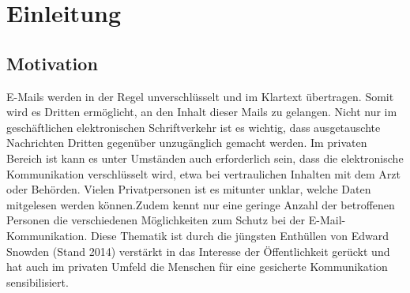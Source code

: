 \documentclass  [paper=a4,
				fontsize=12pt,
				listof=totoc,
				bibliography=totoc
				]{scrreprt}
\begin{document}
	\parindent 0pt %
	
	\pagebreak	%
  \pagestyle{plain}
\begin{small}
  \tableofcontents
	\listoffigures %
	\pagebreak
	\listoftables %
	\pagebreak
	\pagebreak
\end{small}
	\setcounter{page}{1} %
		\pagestyle{fancyplain}
		\fancyhf{}							%
		\renewcommand{\headrulewidth}{0.4pt}
		\footskip =30pt
		\renewcommand{\chaptermark}[1]{\markboth{#1}{}}	%
		\rhead{\nouppercase{\leftmark}}	
		\cfoot{\thepage\ / \pageref{LastPage}}

\chapter{Einleitung}
		\section{Motivation}
		E-Mails werden in der Regel unverschlüsselt und im Klartext übertragen. Somit wird es Dritten ermöglicht, an den Inhalt dieser Mails zu gelangen. Nicht nur im geschäftlichen elektronischen Schriftverkehr ist es wichtig, dass ausgetauschte Nachrichten Dritten gegenüber unzugänglich gemacht werden. Im privaten Bereich ist kann es unter Umständen auch erforderlich sein, dass die elektronische Kommunikation verschlüsselt wird, etwa bei vertraulichen Inhalten mit dem Arzt oder Behörden. Vielen Privatpersonen ist es mitunter unklar, welche Daten mitgelesen werden können.Zudem kennt nur eine geringe Anzahl der betroffenen Personen die verschiedenen Möglichkeiten zum Schutz bei der E-Mail-Kommunikation. Diese Thematik ist durch die jüngsten Enthüllen von Edward Snowden (Stand 2014) verstärkt in das Interesse der Öffentlichkeit gerückt und hat auch im privaten Umfeld die Menschen für eine gesicherte Kommunikation sensibilisiert.
		
\end{document}
